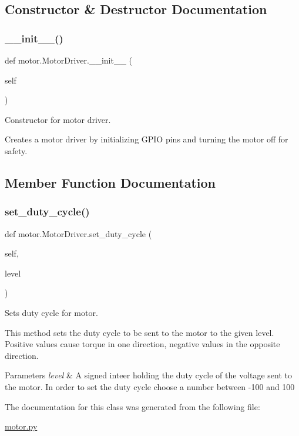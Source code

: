 \subsection{Constructor \& Destructor Documentation}
\mbox{\label{classmotor_1_1_motor_driver_a9e10ee95953b802b06ad4b9b3b6e35b9}} 
\subsubsection{\texorpdfstring{\_\_init\_\_()}{\_\_init\_\_()}}
{\footnotesize\ttfamily def motor.\+Motor\+Driver.\+\_\+\+\_\+init\+\_\+\+\_\+ (\begin{DoxyParamCaption}\item[{}]{self }\end{DoxyParamCaption})}



Constructor for motor driver. 

Creates a motor driver by initializing G\+P\+IO pins and turning the motor off for safety. 

\subsection{Member Function Documentation}
\mbox{\label{classmotor_1_1_motor_driver_a51b4721406aa66e0807413199b8b700f}} 
\subsubsection{\texorpdfstring{set\_duty\_cycle()}{set\_duty\_cycle()}}
{\footnotesize\ttfamily def motor.\+Motor\+Driver.\+set\+\_\+duty\+\_\+cycle (\begin{DoxyParamCaption}\item[{}]{self,  }\item[{}]{level }\end{DoxyParamCaption})}



Sets duty cycle for motor. 

This method sets the duty cycle to be sent to the motor to the given level. Positive values cause torque in one direction, negative values in the opposite direction.


\begin{DoxyParams}{Parameters}
{\em level} & A signed inteer holding the duty cycle of the voltage sent to the motor. In order to set the duty cycle choose a number between -\/100 and 100 \\
\hline
\end{DoxyParams}


The documentation for this class was generated from the following file\+:\begin{DoxyCompactItemize}
\item 
\mbox{\hyperlink{motor_8py}{motor.\+py}}\end{DoxyCompactItemize}
